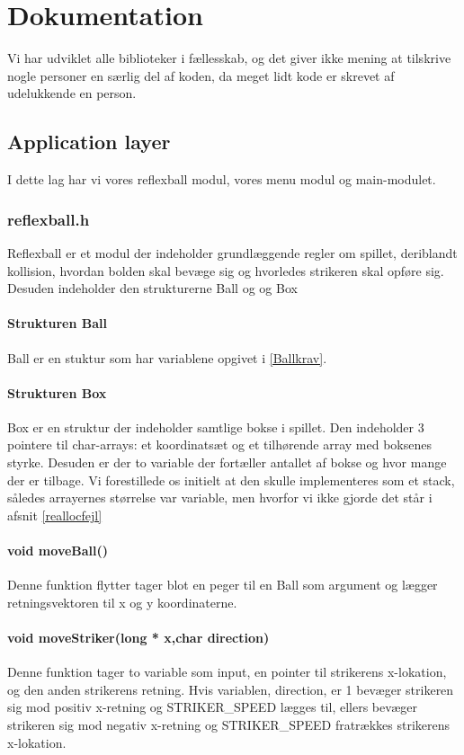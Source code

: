 \section{Dokumentation}
Vi har udviklet alle biblioteker i fællesskab, og det giver ikke mening at tilskrive nogle personer en særlig del af koden, da meget lidt kode er skrevet af udelukkende en person. 

\subsection{Application layer}
I dette lag har vi vores reflexball modul, vores menu modul og main-modulet.
\subsubsection{reflexball.h}
Reflexball er et modul der indeholder grundlæggende regler om spillet, deriblandt kollision, hvordan bolden skal bevæge sig og hvorledes strikeren skal opføre sig. Desuden indeholder den strukturerne Ball og og Box
\paragraph{Strukturen Ball}
Ball er en stuktur som har variablene opgivet i \ref{Ballkrav}.

\paragraph{Strukturen Box}
Box er en struktur der indeholder samtlige bokse i spillet. Den indeholder 3 pointere til char-arrays: et koordinatsæt og et tilhørende array med boksenes styrke. Desuden er der to variable der fortæller antallet af bokse og hvor mange der er tilbage. Vi forestillede os initielt at den skulle implementeres som et stack, således arrayernes størrelse var variable, men hvorfor vi ikke gjorde det står i afsnit \ref{reallocfejl}
\paragraph{void moveBall()}
Denne funktion flytter tager blot en peger til en Ball som argument og lægger retningsvektoren til x og y koordinaterne.
\paragraph{void moveStriker(long * x,char direction)}
Denne funktion tager to variable som input, en pointer til strikerens x-lokation, og den anden strikerens retning. Hvis variablen, direction, er 1 bevæger strikeren sig mod positiv x-retning og STRIKER\_SPEED lægges til, ellers bevæger strikeren sig mod negativ x-retning og STRIKER\_SPEED fratrækkes strikerens x-lokation.
